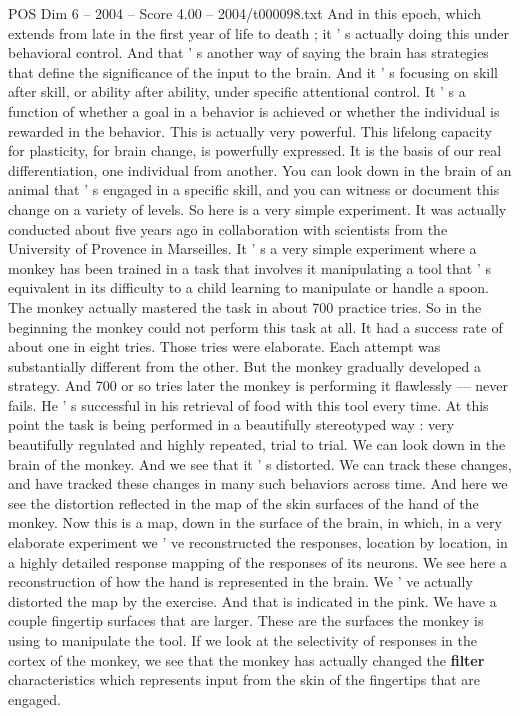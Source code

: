 \begin{textsample}{POS Dim 6 – 2004 – Score 4.00 – 2004/t000098.txt}
And in this epoch, which extends from late in the first year of life to death ; it ' s actually doing this under behavioral control.
And that ' s another way of saying the brain has strategies that define the significance of the input to the brain.
And it ' s focusing on skill after skill, or ability after ability, under specific attentional control.
It ' s a function of whether a goal in a behavior is achieved or whether the individual is rewarded in the behavior.
This is actually very powerful.
This lifelong capacity for plasticity, for brain change, is powerfully expressed.
It is the basis of our real differentiation, one individual from another.
You can look down in the brain of an animal that ' s engaged in a specific skill, and you can witness or document this change on a variety of levels.
So here is a very simple experiment.
It was actually conducted about five years ago in collaboration with scientists from the University of Provence in Marseilles.
It ' s a very simple experiment where a monkey has been trained in a task that involves it manipulating a tool that ' s equivalent in its difficulty to a child learning to manipulate or handle a spoon.
The monkey actually mastered the task in about 700 practice tries.
So in the beginning the monkey could not perform this task at all.
It had a success rate of about one in eight tries.
Those tries were elaborate.
Each attempt was substantially different from the other.
But the monkey gradually developed a strategy.
And 700 or so tries later the monkey is performing it flawlessly — never fails.
He ' s successful in his retrieval of food with this tool every time.
At this point the task is being performed in a beautifully stereotyped way : very beautifully regulated and highly repeated, trial to trial.
We can look down in the brain of the monkey.
And we see that it ' s distorted.
We can track these changes, and have tracked these changes in many such behaviors across time.
And here we see the distortion reflected in the map of the skin surfaces of the hand of the monkey.
Now this is a map, down in the surface of the brain, in which, in a very elaborate experiment we ' ve reconstructed the responses, location by location, in a highly detailed response mapping of the responses of its neurons.
We see here a reconstruction of how the hand is represented in the brain.
We ' ve actually distorted the map by the exercise.
And that is indicated in the pink.
We have a couple fingertip surfaces that are larger.
These are the surfaces the monkey is using to manipulate the tool.
If we look at the selectivity of responses in the cortex of the monkey, we see that the monkey has actually changed the \textbf{filter} characteristics which represents input from the skin of the fingertips that are engaged.

\end{textsample}
